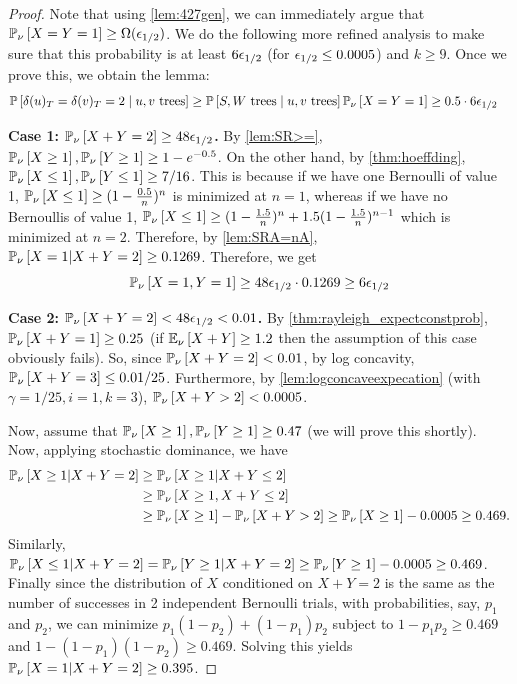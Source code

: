 \begin{proof}
Note that using \cref{lem:427gen}, we can immediately argue that ${\mathbb{P}}_{\nu}\left[X=Y=1\right]\geq \Omega({\epsilon}_{1/2})$. We do the following more refined analysis to make sure that this probability is at least $6{\epsilon}_{1/2}$ (for ${\epsilon}_{1/2}\leq 0.0005$) and $k\geq 9$. Once we prove this, we obtain the lemma:
\begin{align*}
{\mathbb{P}}\left[\delta(u)_T=\delta(v)_T=2 \mid u,v \text{ trees}\right] &\geq {\mathbb{P}}\left[S,W\text{ trees} \mid u,v \text{ trees}\right] {\mathbb{P}}_{\nu}\left[X=Y=1\right] \ge 0.5 \cdot 6 {\epsilon}_{1/2}
\end{align*}

{\bf Case 1: ${\mathbb{P}}_{\nu}\left[X+Y=2\right]\geq 48{\epsilon}_{1/2}$.}
By \cref{lem:SR>=}, ${\mathbb{P}}_{\nu}\left[X\geq 1\right],{\mathbb{P}}_{\nu}\left[Y\geq 1\right]\geq 1-e^{-0.5}$.
On the other hand, %
by \cref{thm:hoeffding}, ${\mathbb{P}}_{\nu}\left[X\leq 1\right],{\mathbb{P}}_{\nu}\left[Y\leq 1\right]\geq 7/16$. This is because if we have one Bernoulli of value 1, ${\mathbb{P}}_{\nu}\left[X\leq 1\right] \ge (1-\frac{0.5}{n})^n$ is minimized at $n=1$, whereas if we have no Bernoullis of value 1, ${\mathbb{P}}_{\nu}\left[X\leq 1\right] \ge (1-\frac{1.5}{n})^n + 1.5(1-\frac{1.5}{n})^{n-1}$ which is minimized at $n=2$. 
Therefore, by \cref{lem:SRA=nA}, ${\mathbb{P}}_{\nu}\left[X=1 | X+Y=2\right] \geq 0.1269$.
Therefore, we get
$${\mathbb{P}}_{\nu}\left[X=1,Y=1\right] \geq 48{\epsilon}_{1/2} \cdot 0.1269 \geq 6{\epsilon}_{1/2}$$ 

{\bf Case 2: ${\mathbb{P}}_{\nu}\left[X+Y=2\right]<48{\epsilon}_{1/2} < 0.01$.}  
By \cref{thm:rayleigh_expectconstprob}, ${\mathbb{P}}_{\nu}\left[X+Y=1\right]\geq 0.25$ (if ${\mathbb{E}}_{\nu}\left[X+Y\right] \ge 1.2$ then the assumption of this case obviously fails). So, since ${\mathbb{P}}_{\nu}\left[X+Y=2\right]<0.01$, by log concavity, ${\mathbb{P}}_{\nu}\left[X+Y=3\right] \le 0.01/25$. Furthermore, by \cref{lem:logconcaveexpecation} (with $\gamma=1/25, i=1,k=3$), ${\mathbb{P}}_{\nu}\left[X+Y > 2\right]<0.0005$.

Now, assume that ${\mathbb{P}}_{\nu}\left[X \ge 1\right],{\mathbb{P}}_{\nu}\left[Y \ge 1\right] \ge 0.47$ (we will prove this shortly). Now, applying stochastic dominance, we have
\begin{align*}
{\mathbb{P}}_{\nu}\left[X\geq 1| X+Y= 2\right] &\geq {\mathbb{P}}_{\nu}\left[X\geq 1 | X+Y\leq 2\right]\\
&\geq {\mathbb{P}}_{\nu}\left[X\geq 1, X+Y\leq 2\right]\\
&\geq {\mathbb{P}}_{\nu}\left[X\geq 1\right] - {\mathbb{P}}_{\nu}\left[X+Y> 2\right] \geq {\mathbb{P}}_{\nu}\left[X\geq 1\right]- 0.0005\geq 0.469.
\end{align*}
Similarly, ${\mathbb{P}}_{\nu}\left[X\leq 1 | X+Y=2\right] ={\mathbb{P}}_{\nu}\left[Y\geq 1 | X+Y=2\right] \geq {\mathbb{P}}_{\nu}\left[Y\geq  1\right]-0.0005\geq 0.469$.
Finally since the distribution of $X$ conditioned on $X+Y=2$ is the same as the number of successes in  2 independent Bernoulli trials, with probabilities,  say, $p_1$ and $p_2$, we can minimize $p_1 (1-p_2) + (1-p_1)p_2$ subject to $1-p_1p_2 \ge 0.469$ and $1-(1-p_1)(1-p_2) \ge 0.469$. Solving this yields  ${\mathbb{P}}_{\nu}\left[X=1 | X+Y=2\right]\geq 0.395$.


\end{proof}
